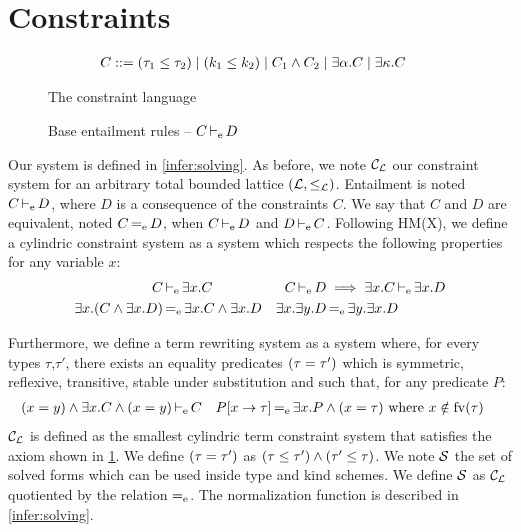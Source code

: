 \section{Constraints}
\label{appendix:constraints}
%
\begin{figure}[tb]
  \centering
  \begin{align*}
    C &::= \Cleq{\tau_1}{\tau_2}
        \mid \Cleq{k_1}{k_2}
        \mid C_1 \Cand C_2
        \mid \Cproj{\tvar}{C}
        \mid \Cproj{\kvar}{C}
  \end{align*}
  \caption{The constraint language}
  \label{grammar:constraint}
  
  \caption{Base entailment rules -- $\entail{C}{D}$ }
  \label{rules:entail}
\end{figure}


Our system is defined in \cref{infer:solving}.
As before, we note $\CL$ our constraint system for an arbitrary
total bounded lattice $(\mathcal L, \lk_\Lat)$.
Entailment is noted $\entail{C}{D}$, where $D$ is a consequence of the
constraints $C$.
We say that $C$ and $D$ are equivalent, noted $C \equivC D$,
when $\entail{C}{D}$ and $\entail{D}{C}$.
Following HM(X), we define a cylindric constraint system as
a system which respects the following properties for any variable $x$:
\begin{align*}
  \entail{C&}{\Cproj{x}{C}}
  &\entail{C}{D} &\implies \entail{\Cproj{x}C}{\Cproj{x}D}\\
  \Cproj{x}{(C\wedge \Cproj{x}D)}&\equivC \Cproj{x}{C} \wedge \Cproj{x}D
  & \Cproj{x}{\Cproj{y}D}&\equivC \Cproj{y}{\Cproj{x}D}
\end{align*}

Furthermore, we define a term rewriting system as a system where, for every
types $\tau$,$\tau'$, there exists an equality predicates $\Ceq{\tau}{\tau'}$
which is symmetric, reflexive, transitive, stable under substitution and such that,
for any predicate $P$:
\begin{align*}
  \entail{\Ceq{x}{y}\wedge \Cproj{x}C \wedge \Ceq{x}{y}&}{C}
  &\subst{x}{\tau}{P} &\equivC \Cproj{x}P \wedge \Ceq{x}{\tau}
                        \text{ where } x\notin\fv{\tau}
\end{align*}
$\CL$ is defined as the smallest cylindric term constraint system that
satisfies the axiom shown in \cref{rules:entail}.
We define  $\Ceq{\tau}{\tau'}$ as $\Cleq{\tau}{\tau'} \wedge \Cleq{\tau'}{\tau}$.
%
We note $\SC$ the set of solved forms
which can be used inside type and kind schemes.
We define $\SC$ as $\CL$ quotiented by the relation $\equivC$.
%
The normalization function is described in \cref{infer:solving}.

